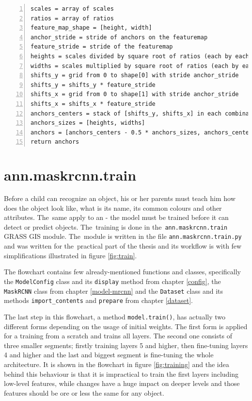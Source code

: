 {\scriptsize
\begin{lstlisting}[style=python, caption={generate\_anchors}, captionpos=b, 
label=code:anchors, deletekeywords={range, from, map, in},
backgroundcolor = \color{light-gray}, numbers=left, breaklines=true]
scales = array of scales
ratios = array of ratios
feature_map_shape = [height, width]
anchor_stride = stride of anchors on the featuremap
feature_stride = stride of the featuremap
heights = scales divided by square root of ratios (each by each)
widths = scales multiplied by square root of ratios (each by each)
shifts_y = grid from 0 to shape[0] with stride anchor_stride
shifts_y = shifts_y * feature_stride
shifts_x = grid from 0 to shape[1] with stride anchor_stride
shifts_x = shifts_x * feature_stride
anchors_centers = stack of [shifts_y, shifts_x] in each combination
anchors_sizes = [heights, widths]
anchors = [anchors_centers - 0.5 * anchors_sizes, anchors_centers + 0.5 * anchors_sizes]
return anchors
\end{lstlisting}}

\section{ann.maskrcnn.train}
\label{train-module}

Before a child can recognize an object, his or her parents must teach him how 
does the object look like, what is its name, its common colours and other 
attributes. The~same apply to an  - the model must be trained before it 
can detect or predict objects. The~training is done in the~\verb|ann.maskrcnn.train|
GRASS GIS module. The~module is written in the file 
\verb|ann.maskrcnn.train.py| and was written for the~practical part of the 
thesis and its workflow is with few simplifications illustrated in figure 
\ref{fig:train}.

The flowchart contains few already-mentioned functions and classes, specifically 
the \verb|ModelConfig| class and its \verb|display| method from chapter 
\ref{config}, the \verb|MaskRCNN| class from chapter \ref{model-mrcnn} and the 
\verb|Dataset| class and its methods \verb|import_contents| and \verb|prepare| 
from chapter \ref{dataset}.

The last step in this flowchart, a method \verb|model.train()|, has actually two 
different forms depending on the usage of initial weights. The first form is 
applied for a training from a scratch and trains all layers. The second one 
consists of three smaller segments; firstly training layers 5 and higher, then 
fine-tuning layers 4 and higher and the last and biggest segment is fine-tuning 
the whole architecture. It is shown in the flowchart in figure 
\ref{fig:training} and the idea behind this behaviour is that it is impractical 
to train the first layers including low-level features, while changes have a 
huge impact on deeper levels and those features should be ore or less the same 
for any object.

